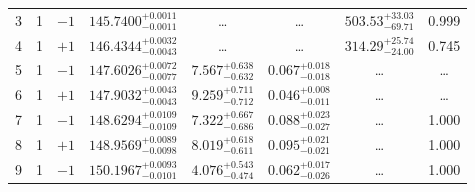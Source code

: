 \begin{table*}[!]
\begin{tabular}{llcrrlrc}
3 & 1 & $-1$ & $    145.7400_{-      0.0011}^{+      0.0011}$ & \multicolumn{1}{c}{\dots} & \multicolumn{1}{c}{\dots} & $      503.53_{-       69.71}^{+       33.03}$ & 0.999\\[1pt]
4 & 1 & $+1$ & $    146.4344_{-      0.0043}^{+      0.0032}$ & \multicolumn{1}{c}{\dots} & \multicolumn{1}{c}{\dots} & $      314.29_{-       24.00}^{+       25.74}$ & 0.745\\[1pt]
5 & 1 & $-1$ & $    147.6026_{-      0.0077}^{+      0.0072}$ & $       7.567_{-       0.632}^{+       0.638}$ & $       0.067_{-       0.018}^{+       0.018}$ & \multicolumn{1}{c}{\dots} & \dots \\[1pt]
6 & 1 & $+1$ & $    147.9032_{-      0.0043}^{+      0.0043}$ & $       9.259_{-       0.712}^{+       0.711}$ & $       0.046_{-       0.011}^{+       0.008}$ & \multicolumn{1}{c}{\dots} & \dots \\[1pt]
7 & 1 & $-1$ & $    148.6294_{-      0.0109}^{+      0.0109}$ & $       7.322_{-       0.686}^{+       0.667}$ & $       0.088_{-       0.027}^{+       0.023}$ & \multicolumn{1}{c}{\dots} &1.000 \\[1pt]
8 & 1 & $+1$ & $    148.9569_{-      0.0098}^{+      0.0089}$ & $       8.019_{-       0.611}^{+       0.618}$ & $       0.095_{-       0.021}^{+       0.021}$ & \multicolumn{1}{c}{\dots} & 1.000\\[1pt]
9 & 1 & $-1$ & $    150.1967_{-      0.0101}^{+      0.0093}$ & $       4.076_{-       0.474}^{+       0.543}$ & $       0.062_{-       0.026}^{+       0.017}$ & \multicolumn{1}{c}{\dots} & 1.000\\[1pt]


\end{tabular}
\end{table*}
